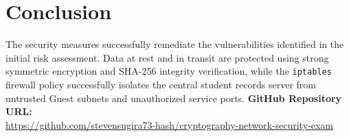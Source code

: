 \documentclass[11pt,a4paper]{article}
\begin{document}
\section{Conclusion}
The security measures successfully remediate the vulnerabilities identified in the initial risk assessment. Data at rest and in transit are protected using strong symmetric encryption and SHA-256 integrity verification, while the \texttt{iptables} firewall policy successfully isolates the central student records server from untrusted Guest subnets and unauthorized service ports.
\vspace{0.5cm}
\noindent\textbf{GitHub Repository URL:} \\
\url{https://github.com/stevensugira73-hash/cryptography-network-security-exam}
\end{document}
